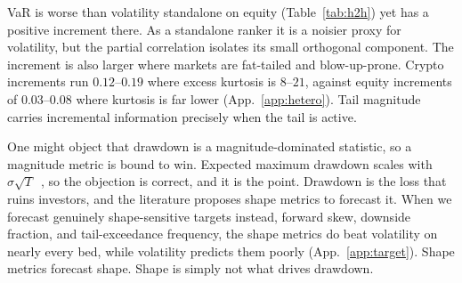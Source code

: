 \documentclass[sigconf,nonacm]{acmart}
\begin{document}
VaR is worse than volatility
standalone on equity (Table~\ref{tab:h2h}) yet has a positive increment there.
As a standalone ranker it is a noisier proxy for volatility, but the partial
correlation isolates its small orthogonal component. The increment is also larger where
markets are fat-tailed and blow-up-prone. Crypto increments run $0.12$--$0.19$ where excess
kurtosis is $8$--$21$, against equity increments of $0.03$--$0.08$ where kurtosis is far
lower (App.~\ref{app:hetero}).
Tail magnitude carries incremental information precisely when the tail is active.

One might object that drawdown is a magnitude-dominated statistic, so a magnitude
metric is bound to win. Expected maximum drawdown scales with $\sigma\sqrt{T}$~\cite{magdonismail2004},
so the objection is correct, and it is the point. Drawdown is the loss that ruins
investors, and the literature proposes shape metrics to forecast it. When we forecast
genuinely shape-sensitive targets instead, forward skew, downside fraction, and
tail-exceedance frequency, the shape metrics do beat volatility on nearly every
bed, while volatility predicts them poorly (App.~\ref{app:target}). Shape metrics
forecast shape. Shape is simply not what drives drawdown.
\end{document}
